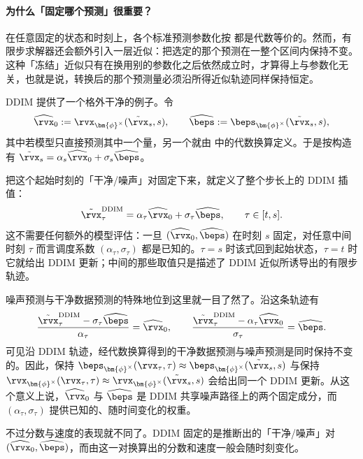 \paragraph{为什么「固定哪个预测」很重要？}
在任意固定的状态和时刻上，各个标准预测参数化按  都是代数等价的。然而，有限步求解器还会额外引入一层近似：把选定的那个预测在一整个区间内保持不变。这种「冻结」近似只有在换用别的参数化之后依然成立时，才算得上与参数化无关，也就是说，转换后的那个预测量必须沿所得近似轨迹同样保持恒定。

DDIM 提供了一个格外干净的例子。令
\[
\widehat\rvx_0
:=
\rvx_{\bm{\phi}^\times}(\tilde\rvx_s,s),
\qquad
\widehat\beps
:=
\beps_{\bm{\phi}^\times}(\tilde\rvx_s,s),
\]
其中若模型只直接预测其中一个量，另一个就由  中的代数换算定义。于是按构造有
$\tilde\rvx_s=\alpha_s\widehat\rvx_0+\sigma_s\widehat\beps$。

把这个起始时刻的「干净/噪声」对固定下来，就定义了整个步长上的 DDIM 插值：
\[
\tilde\rvx_\tau^{\mathrm{DDIM}}
=
\alpha_\tau\widehat\rvx_0
+
\sigma_\tau\widehat\beps,
\qquad
\tau\in[t,s].
\]
这不需要任何额外的模型评估：一旦 $(\widehat\rvx_0,\widehat\beps)$ 在时刻 $s$ 固定，对任意中间时刻 $\tau$ 而言调度系数 $(\alpha_\tau,\sigma_\tau)$ 都是已知的。$\tau=s$ 时该式回到起始状态，$\tau=t$ 时它就给出 DDIM 更新；中间的那些取值只是描述了 DDIM 近似所诱导出的有限步轨迹。

噪声预测与干净数据预测的特殊地位到这里就一目了然了。沿这条轨迹有
\[
\frac{
\tilde\rvx_\tau^{\mathrm{DDIM}}
-
\sigma_\tau\widehat\beps
}{
\alpha_\tau
}
=
\widehat\rvx_0,
\qquad
\frac{
\tilde\rvx_\tau^{\mathrm{DDIM}}
-
\alpha_\tau\widehat\rvx_0
}{
\sigma_\tau
}
=
\widehat\beps.
\]
可见沿 DDIM 轨迹，经代数换算得到的干净数据预测与噪声预测是同时保持不变的。因此，保持 $\beps_{\bm{\phi}^\times}(\rvx_\tau,\tau)
\approx\beps_{\bm{\phi}^\times}(\tilde\rvx_s,s)$ 与保持 $\rvx_{\bm{\phi}^\times}(\rvx_\tau,\tau)
\approx\rvx_{\bm{\phi}^\times}(\tilde\rvx_s,s)$ 会给出同一个 DDIM 更新。从这个意义上说，$\widehat\rvx_0$ 与 $\widehat\beps$ 是 DDIM 共享噪声路径上的两个固定成分，而 $(\alpha_\tau,\sigma_\tau)$ 提供已知的、随时间变化的权重。

不过分数与速度的表现就不同了。DDIM 固定的是推断出的「干净/噪声」对 $(\widehat\rvx_0,\widehat\beps)$，而由这一对换算出的分数和速度一般会随时刻变化。

